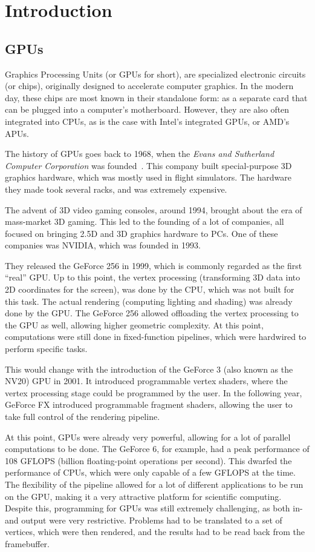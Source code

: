 \chapter{Introduction}\label{ch:introduction}

\section{GPUs}\label{sec:gpus}
Graphics Processing Units (or GPUs for short), are specialized electronic circuits (or chips), originally designed to accelerate computer graphics.
In the modern day, these chips are most known in their standalone form: as a separate card that can be plugged into a computer's motherboard.
However, they are also often integrated into CPUs, as is the case with Intel's integrated GPUs, or AMD's APUs.

The history of GPUs goes back to 1968, when the \textit{Evans and Sutherland Computer Corporation} was founded~\cite{gpu-evolution}.
This company built special-purpose 3D graphics hardware, which was mostly used in flight simulators.
The hardware they made took several racks, and was extremely expensive.

The advent of 3D video gaming consoles, around 1994, brought about the era of mass-market 3D gaming.
This led to the founding of a lot of companies, all focused on bringing 2.5D and 3D graphics hardware to PCs.
One of these companies was NVIDIA, which was founded in 1993.

They released the GeForce 256 in 1999, which is commonly regarded as the first ``real'' GPU\@.
Up to this point, the vertex processing (transforming 3D data into 2D coordinates for the screen), was done by the CPU, which was not built for this task.
The actual rendering (computing lighting and shading) was already done by the GPU\@.
The GeForce 256 allowed offloading the vertex processing to the GPU as well, allowing higher geometric complexity.
At this point, computations were still done in fixed-function pipelines, which were hardwired to perform specific tasks.

This would change with the introduction of the GeForce 3 (also known as the NV20) GPU in 2001.
It introduced programmable vertex shaders, where the vertex processing stage could be programmed by the user.
In the following year, GeForce FX introduced programmable fragment shaders, allowing the user to take full control of the rendering pipeline.

At this point, GPUs were already very powerful, allowing for a lot of parallel computations to be done.
The GeForce 6, for example, had a peak performance of 108 GFLOPS (billion floating-point operations per second).
This dwarfed the performance of CPUs, which were only capable of a few GFLOPS at the time.
The flexibility of the pipeline allowed for a lot of different applications to be run on the GPU, making it a very attractive platform for scientific computing.
Despite this, programming for GPUs was still extremely challenging, as both in- and output were very restrictive.
Problems had to be translated to a set of vertices, which were then rendered, and the results had to be read back from the framebuffer.

